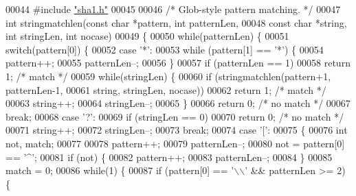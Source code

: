 \begin{DoxyCode}
00044 \textcolor{preprocessor}{#}\textcolor{preprocessor}{include} \hyperlink{sha1_8h}{"sha1.h"}
00045 
00046 \textcolor{comment}{/* Glob-style pattern matching. */}
00047 \textcolor{keywordtype}{int} stringmatchlen(\textcolor{keyword}{const} \textcolor{keywordtype}{char} *pattern, \textcolor{keywordtype}{int} patternLen,
00048         \textcolor{keyword}{const} \textcolor{keywordtype}{char} *string, \textcolor{keywordtype}{int} stringLen, \textcolor{keywordtype}{int} nocase)
00049 \{
00050     \textcolor{keywordflow}{while}(patternLen) \{
00051         \textcolor{keywordflow}{switch}(pattern[0]) \{
00052         \textcolor{keywordflow}{case} \textcolor{stringliteral}{'*'}:
00053             \textcolor{keywordflow}{while} (pattern[1] == \textcolor{stringliteral}{'*'}) \{
00054                 pattern++;
00055                 patternLen--;
00056             \}
00057             \textcolor{keywordflow}{if} (patternLen == 1)
00058                 \textcolor{keywordflow}{return} 1; \textcolor{comment}{/* match */}
00059             \textcolor{keywordflow}{while}(stringLen) \{
00060                 \textcolor{keywordflow}{if} (stringmatchlen(pattern+1, patternLen-1,
00061                             string, stringLen, nocase))
00062                     \textcolor{keywordflow}{return} 1; \textcolor{comment}{/* match */}
00063                 string++;
00064                 stringLen--;
00065             \}
00066             \textcolor{keywordflow}{return} 0; \textcolor{comment}{/* no match */}
00067             \textcolor{keywordflow}{break};
00068         \textcolor{keywordflow}{case} \textcolor{stringliteral}{'?'}:
00069             \textcolor{keywordflow}{if} (stringLen == 0)
00070                 \textcolor{keywordflow}{return} 0; \textcolor{comment}{/* no match */}
00071             string++;
00072             stringLen--;
00073             \textcolor{keywordflow}{break};
00074         \textcolor{keywordflow}{case} \textcolor{stringliteral}{'['}:
00075         \{
00076             \textcolor{keywordtype}{int} \textcolor{keyword}{not}, match;
00077 
00078             pattern++;
00079             patternLen--;
00080             \textcolor{keyword}{not} = pattern[0] == \textcolor{stringliteral}{'^'};
00081             \textcolor{keywordflow}{if} (\textcolor{keyword}{not}) \{
00082                 pattern++;
00083                 patternLen--;
00084             \}
00085             match = 0;
00086             \textcolor{keywordflow}{while}(1) \{
00087                 \textcolor{keywordflow}{if} (pattern[0] == \textcolor{stringliteral}{'\(\backslash\)\(\backslash\)'} && patternLen >= 2) \{

\end{DoxyCode}
